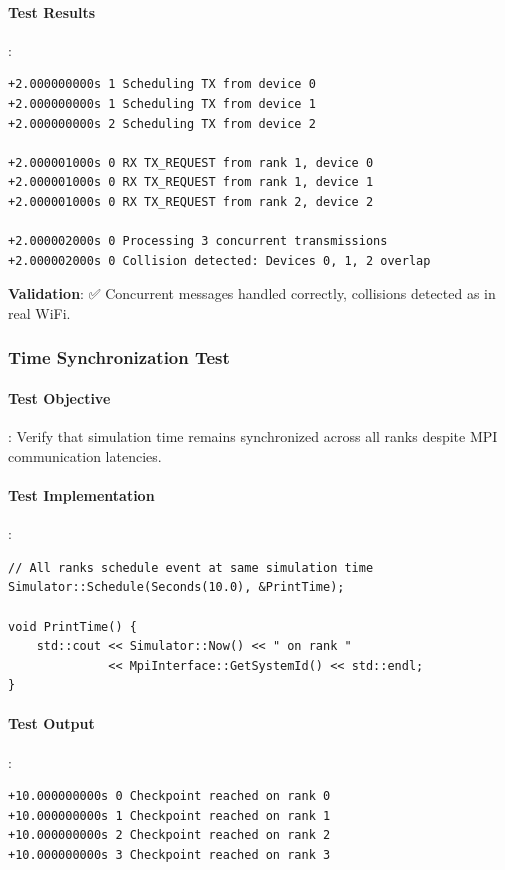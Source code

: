 \paragraph{Test Results}:
\begin{verbatim}
+2.000000000s 1 Scheduling TX from device 0
+2.000000000s 1 Scheduling TX from device 1
+2.000000000s 2 Scheduling TX from device 2

+2.000001000s 0 RX TX_REQUEST from rank 1, device 0
+2.000001000s 0 RX TX_REQUEST from rank 1, device 1
+2.000001000s 0 RX TX_REQUEST from rank 2, device 2

+2.000002000s 0 Processing 3 concurrent transmissions
+2.000002000s 0 Collision detected: Devices 0, 1, 2 overlap
\end{verbatim}

\textbf{Validation}: ✅ Concurrent messages handled correctly, collisions detected as in real WiFi.

\subsubsection{Time Synchronization Test}

\paragraph{Test Objective}:
Verify that simulation time remains synchronized across all ranks despite MPI communication latencies.

\paragraph{Test Implementation}:
\begin{lstlisting}[style=cpp]
// All ranks schedule event at same simulation time
Simulator::Schedule(Seconds(10.0), &PrintTime);

void PrintTime() {
    std::cout << Simulator::Now() << " on rank " 
              << MpiInterface::GetSystemId() << std::endl;
}
\end{lstlisting}

\paragraph{Test Output}:
\begin{verbatim}
+10.000000000s 0 Checkpoint reached on rank 0
+10.000000000s 1 Checkpoint reached on rank 1
+10.000000000s 2 Checkpoint reached on rank 2
+10.000000000s 3 Checkpoint reached on rank 3
\end{verbatim}

